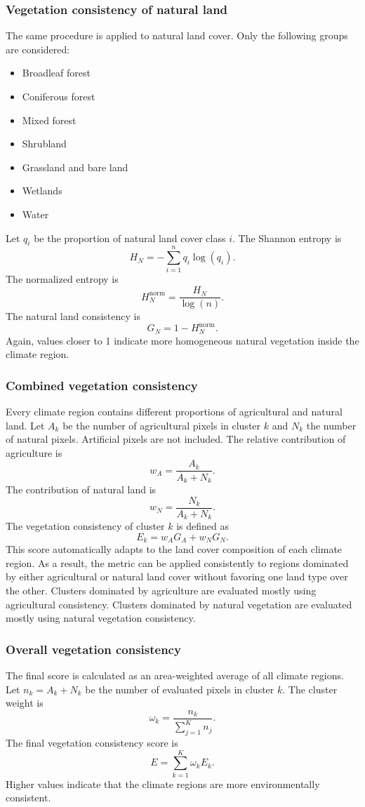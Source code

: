 \documentclass[11pt]{article}
\begin{document}
\subsubsection{Vegetation consistency of natural land}
The same procedure is applied to natural land cover. Only the following groups are considered:
\begin{itemize}
  \item Broadleaf forest
  \item Coniferous forest
  \item Mixed forest
  \item Shrubland
  \item Grassland and bare land
  \item Wetlands
  \item Water
\end{itemize}
Let $q_i$ be the proportion of natural land cover class $i$. The Shannon entropy is
\[
H_N=-\sum_{i=1}^{n} q_i \log(q_i).
\]
The normalized entropy is
\[
H_N^{\mathrm{norm}}
=
\frac{H_N}{\log(n)}.
\]
The natural land consistency is
\[
G_N
=
1-H_N^{\mathrm{norm}}.
\]
Again, values closer to 1 indicate more homogeneous natural vegetation inside the climate region.

\subsubsection{Combined vegetation consistency}
Every climate region contains different proportions of agricultural and natural land. Let $A_k$ be the number of agricultural pixels in cluster $k$ and $N_k$ the number of natural pixels. Artificial pixels are not included. The relative contribution of agriculture is
\[
w_A
=
\frac{A_k}{A_k+N_k}.
\]
The contribution of natural land is
\[
w_N
=
\frac{N_k}{A_k+N_k}.
\]
The vegetation consistency of cluster $k$ is defined as
\[
E_k
=
w_A G_A
+
w_N G_N.
\]
This score automatically adapts to the land cover composition of each climate region. As a result, the metric can be applied consistently to regions dominated by either agricultural or natural land cover without favoring one land type over the other. Clusters dominated by agriculture are evaluated mostly using agricultural consistency. Clusters dominated by natural vegetation are evaluated mostly using natural vegetation consistency.

\subsubsection{Overall vegetation consistency}
The final score is calculated as an area-weighted average of all climate regions. Let $n_k=A_k+N_k$ be the number of evaluated pixels in cluster $k$. The cluster weight is 
\[
\omega_k
=
\frac{n_k}
{\sum_{j=1}^{K} n_j}.
\]
The final vegetation consistency score is
\[
E
=
\sum_{k=1}^{K}
\omega_k E_k.
\]
Higher values indicate that the climate regions are more environmentally consistent.
\end{document}
